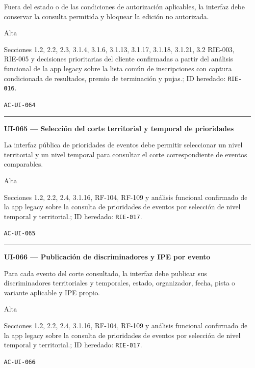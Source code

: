 \documentclass[10pt,letterpaper]{article}
\begin{document}
\begin{description}[style=nextline,leftmargin=3.15cm,labelwidth=2.8cm,font=\normalfont\bfseries]
\item[Obligación] Fuera del estado o de las condiciones de autorización aplicables, la interfaz debe conservar la consulta permitida y bloquear la edición no autorizada.
\item[Prioridad] Alta
\item[Procedencia] Secciones 1.2, 2.2, 2.3, 3.1.4, 3.1.6, 3.1.13, 3.1.17, 3.1.18, 3.1.21, 3.2 RIE-003, RIE-005 y decisiones prioritarias del cliente confirmadas a partir del análisis funcional de la app legacy sobre la lista común de inscripciones con captura condicionada de resultados, premio de terminación y pujas.; ID heredado: \texttt{RIE-016}.
\item[Verificación] \texttt{AC-UI-064}
\end{description}
\vspace{0.25em}\hrule\vspace{0.65em}
\noindent\textbf{UI-065 --- Selección del corte territorial y temporal de prioridades}\par
\begin{description}[style=nextline,leftmargin=3.15cm,labelwidth=2.8cm,font=\normalfont\bfseries]
\item[Obligación] La interfaz pública de prioridades de eventos debe permitir seleccionar un nivel territorial y un nivel temporal para consultar el corte correspondiente de eventos comparables.
\item[Prioridad] Alta
\item[Procedencia] Secciones 1.2, 2.2, 2.4, 3.1.16, RF-104, RF-109 y análisis funcional confirmado de la app legacy sobre la consulta de prioridades de eventos por selección de nivel temporal y territorial.; ID heredado: \texttt{RIE-017}.
\item[Verificación] \texttt{AC-UI-065}
\end{description}
\vspace{0.25em}\hrule\vspace{0.65em}
\noindent\textbf{UI-066 --- Publicación de discriminadores y IPE por evento}\par
\begin{description}[style=nextline,leftmargin=3.15cm,labelwidth=2.8cm,font=\normalfont\bfseries]
\item[Obligación] Para cada evento del corte consultado, la interfaz debe publicar sus discriminadores territoriales y temporales, estado, organizador, fecha, pista o variante aplicable y IPE propio.
\item[Prioridad] Alta
\item[Procedencia] Secciones 1.2, 2.2, 2.4, 3.1.16, RF-104, RF-109 y análisis funcional confirmado de la app legacy sobre la consulta de prioridades de eventos por selección de nivel temporal y territorial.; ID heredado: \texttt{RIE-017}.
\item[Verificación] \texttt{AC-UI-066}
\end{description}
\end{document}
